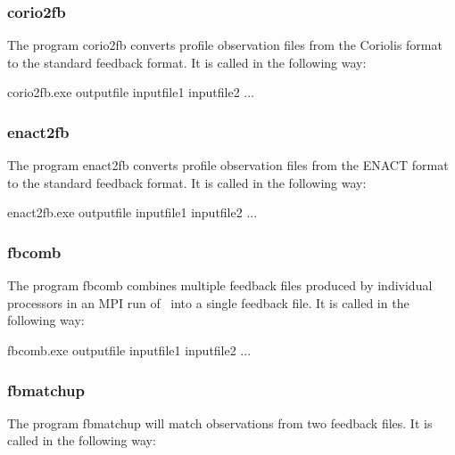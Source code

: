 \documentclass[../main/NEMO_manual]{subfiles}
\begin{document}
\subsubsection{corio2fb}

The program corio2fb converts profile observation files from the Coriolis format to the standard feedback format.
It is called in the following way:

\begin{cmds}
corio2fb.exe outputfile inputfile1 inputfile2 ...
\end{cmds}

\subsubsection{enact2fb}

The program enact2fb converts profile observation files from the ENACT format to the standard feedback format.
It is called in the following way:

\begin{cmds}
enact2fb.exe outputfile inputfile1 inputfile2 ...
\end{cmds}

\subsubsection{fbcomb}

The program fbcomb combines multiple feedback files produced by individual processors in
an MPI run of \NEMO\ into a single feedback file.
It is called in the following way:

\begin{cmds}
fbcomb.exe outputfile inputfile1 inputfile2 ...
\end{cmds}

\subsubsection{fbmatchup}

The program fbmatchup will match observations from two feedback files.
It is called in the following way:
\end{document}
